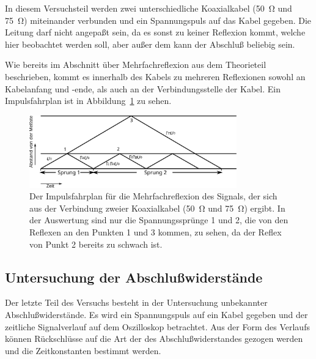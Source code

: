 In diesem Versuchsteil werden zwei unterschiedliche Koaxialkabel
(\SI{50}{\ohm} und \SI{75}{\ohm}) miteinander verbunden und ein
Spannungspuls auf das Kabel gegeben.  Die Leitung darf nicht
angepaßt sein, da es sonst zu keiner Reflexion kommt, welche hier
beobachtet werden soll, aber außer dem kann der Abschluß beliebig
sein.

Wie bereits im Abschnitt über Mehrfachreflexion aus dem
Theorieteil beschrieben, kommt es innerhalb des Kabels zu
mehreren Reflexionen sowohl an Kabelanfang und -ende, als auch an
der Verbindungsstelle der Kabel.  Ein Impulsfahrplan ist in
Abbildung~\ref{fig:impulsfahrplan} zu sehen.

\begin{figure}
  \centering
  \includegraphics[width=0.8\textwidth]{impulsfahrplan}
  \caption{Der Impulsfahrplan für die Mehrfachreflexion des
    Signals, der sich aus der Verbindung zweier Koaxialkabel
    (\SI{50}{\ohm} und \SI{75}{\ohm}) ergibt.  In der Auswertung
    sind nur die Spannungssprünge 1 und 2, die von den Reflexen
    an den Punkten 1 und 3 kommen, zu sehen, da der Reflex von
    Punkt 2 bereits zu schwach ist.}
  \label{fig:impulsfahrplan}
\end{figure}

\subsection{Untersuchung der Abschlußwiderstände}

Der letzte Teil des Versuchs besteht in der Untersuchung
unbekannter Abschlußwiderstände.  Es wird ein Spannungspuls auf
ein Kabel gegeben und der zeitliche Signalverlauf auf dem
Oszilloskop betrachtet.  Aus der Form des Verlaufs können
Rückschlüsse auf die Art der des Abschlußwiderstandes gezogen
werden und die Zeitkonstanten bestimmt werden.




